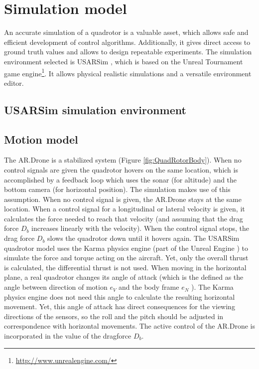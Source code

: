 	\section{Simulation model}
An accurate simulation of a quadrotor is a valuable asset, which allows safe and efficient development of control algorithms.
Additionally, it gives direct access to ground truth values and allows to design repeatable experiments.
The simulation environment selected is USARSim \cite{Balakirsky2009iros}, which is based on the Unreal Tournament game engine\footnote{\url{http://www.unrealengine.com/}}.
It allows physical realistic simulations and a versatile environment editor.

		\subsection{USARSim simulation environment}
		\subsection{Motion model}
The AR.Drone is a stabilized system (Figure \ref{fig:QuadRotorBody}). When no control signals are given the quadrotor hovers on the same location, which is accomplished by a feedback loop which uses the sonar (for altitude) and the bottom camera (for horizontal position). The simulation makes use of this assumption. When no control signal is given, the AR.Drone stays at the same location.
When a control signal for a longitudinal or lateral velocity is given, it calculates the force needed to reach that velocity (and assuming that the drag force $D_b$ increases linearly with the velocity). When the control signal stops, the drag force $D_b$ slows the quadrotor down until it hovers again.
The USARSim quadrotor model uses the Karma physics engine (part of the Unreal Engine \cite{Carpin2006}) to simulate the force and torque acting on the aircraft. Yet, only the overall thrust is calculated, the differential thrust is not used.
When moving in the horizontal plane, a real quadrotor changes its angle of attack (which is the defined as the angle between direction of motion $e_V$ and the body frame $e_N$ \cite{Yechout2003}). 
The Karma physics engine does not need this angle to calculate the resulting horizontal movement. Yet, this angle of attack has direct consequences for the viewing directions of the sensors, so the roll and the pitch should be adjusted in correspondence with horizontal movements. The active control of the AR.Drone is incorporated in the value of the dragforce $D_b$.

